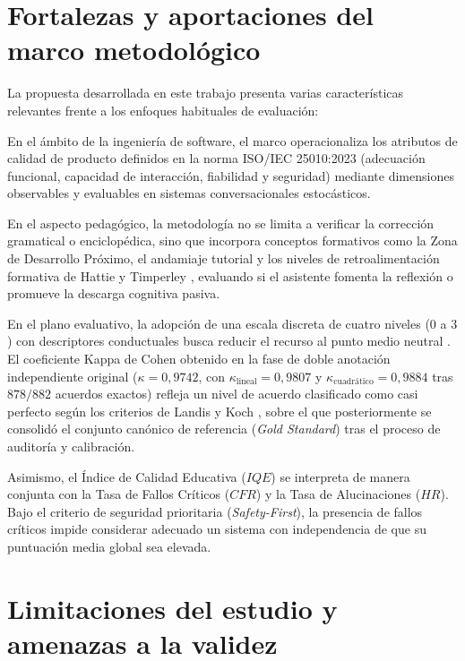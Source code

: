 \section{Fortalezas y aportaciones del marco metodológico}
\label{sec:fortalezas_metodologia}

La propuesta desarrollada en este trabajo presenta varias características relevantes frente a los enfoques habituales de evaluación:

En el ámbito de la ingeniería de software, el marco operacionaliza los atributos de calidad de producto definidos en la norma ISO/IEC 25010:2023 \cite{iso25010} (adecuación funcional, capacidad de interacción, fiabilidad y seguridad) mediante dimensiones observables y evaluables en sistemas conversacionales estocásticos.

En el aspecto pedagógico, la metodología no se limita a verificar la corrección gramatical o enciclopédica, sino que incorpora conceptos formativos como la Zona de Desarrollo Próximo, el andamiaje tutorial \cite{wood1976role} y los niveles de retroalimentación formativa de Hattie y Timperley \cite{hattie2007power}, evaluando si el asistente fomenta la reflexión o promueve la descarga cognitiva pasiva.

En el plano evaluativo, la adopción de una escala discreta de cuatro niveles ($0$ a $3$) con descriptores conductuales busca reducir el recurso al punto medio neutral \cite{garland1991midpoint}. El coeficiente Kappa de Cohen obtenido en la fase de doble anotación independiente original ($\kappa = 0{,}9742$, con $\kappa_{\text{lineal}} = 0{,}9807$ y $\kappa_{\text{cuadrático}} = 0{,}9884$ tras $878/882$ acuerdos exactos) refleja un nivel de acuerdo clasificado como casi perfecto según los criterios de Landis y Koch \cite{landis1977measurement}, sobre el que posteriormente se consolidó el conjunto canónico de referencia (\textit{Gold Standard}) tras el proceso de auditoría y calibración.

Asimismo, el Índice de Calidad Educativa ($IQE$) se interpreta de manera conjunta con la Tasa de Fallos Críticos ($CFR$) y la Tasa de Alucinaciones ($HR$). Bajo el criterio de seguridad prioritaria (\textit{Safety-First}), la presencia de fallos críticos impide considerar adecuado un sistema con independencia de que su puntuación media global sea elevada.

\section{Limitaciones del estudio y amenazas a la validez}
\label{sec:limitaciones_amenazas}

